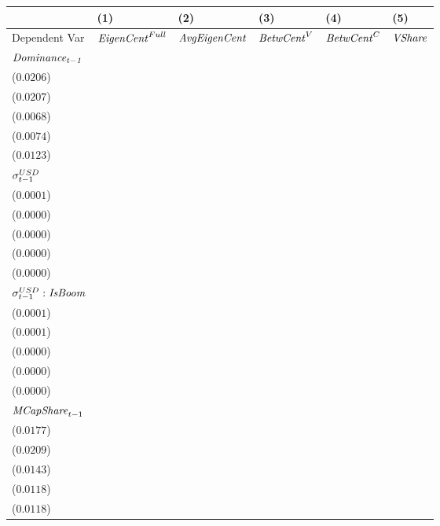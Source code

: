\begin{tabular}{llllll}
\toprule
{} &                                       (1) &                                      (2) &                                       (3) &                                       (4) &                                       (5) \\
\midrule
Dependent Var                             &                  ${\it EigenCent}^{Full}$ &                     ${\it AvgEigenCent}$ &                        ${\it BetwCent}^V$ &                        ${\it BetwCent}^C$ &                            ${\it VShare}$ \\
$\it Dominance_{t-1}$                     &   \makecell{$0.8160^{***}$ \\ ($0.0206$)} &  \makecell{$0.8286^{***}$ \\ ($0.0207$)} &   \makecell{$0.9484^{***}$ \\ ($0.0068$)} &   \makecell{$0.9492^{***}$ \\ ($0.0074$)} &   \makecell{$0.8663^{***}$ \\ ($0.0123$)} \\
${\it \sigma}^{USD}_{t-1}$                &   \makecell{$-0.0001^{**}$ \\ ($0.0001$)} &  \makecell{$-0.0001^{**}$ \\ ($0.0000$)} &     \makecell{$0.0000^{*}$ \\ ($0.0000$)} &      \makecell{$0.0000^{}$ \\ ($0.0000$)} &   \makecell{$-0.0000^{**}$ \\ ($0.0000$)} \\
${\it \sigma}^{USD}_{t-1}:{\it IsBoom}$   &   \makecell{$0.0003^{***}$ \\ ($0.0001$)} &  \makecell{$0.0002^{***}$ \\ ($0.0001$)} &     \makecell{$-0.0000^{}$ \\ ($0.0000$)} &     \makecell{$-0.0000^{}$ \\ ($0.0000$)} &   \makecell{$0.0000^{***}$ \\ ($0.0000$)} \\
${\it MCapShare}_{t-1}$                   &     \makecell{$-0.0092^{}$ \\ ($0.0177$)} &    \makecell{$-0.0132^{}$ \\ ($0.0209$)} &     \makecell{$0.0245^{*}$ \\ ($0.0143$)} &    \makecell{$0.0296^{**}$ \\ ($0.0118$)} &      \makecell{$0.0139^{}$ \\ ($0.0118$)} \\

\end{tabular}
